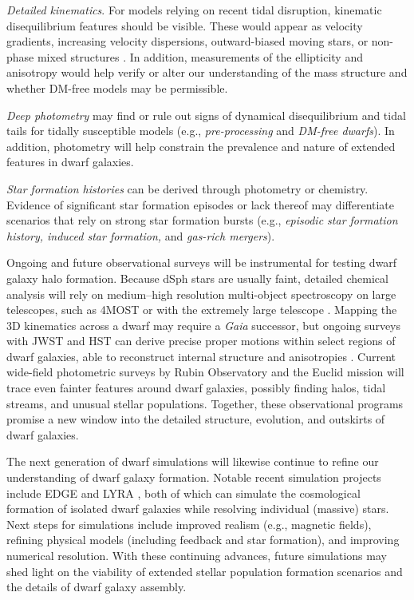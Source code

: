 \emph{Detailed kinematics}. For models relying on recent tidal
disruption, kinematic disequilibrium features should be visible. These
would appear as velocity gradients, increasing velocity dispersions,
outward-biased moving stars, or non-phase mixed structures
\citep[e.g,][]{kroupa1997, read+2006, sanchez-salcedo+hernandez2007}. In
addition, measurements of the ellipticity and anisotropy would help
verify or alter our understanding of the mass structure and whether
DM-free models may be permissible.

\emph{Deep photometry} may find or rule out signs of dynamical
disequilibrium and tidal tails for tidally susceptible models (e.g.,
\emph{pre-processing} and \emph{DM-free dwarfs}). In addition,
photometry will help constrain the prevalence and nature of extended
features in dwarf galaxies.

\emph{Star formation histories} can be derived through photometry or
chemistry. Evidence of significant star formation episodes or lack
thereof may differentiate scenarios that rely on strong star formation
bursts (e.g., \emph{episodic star formation history, induced star
formation,} and \emph{gas-rich mergers}).

Ongoing and future observational surveys will be instrumental for
testing dwarf galaxy halo formation. Because dSph stars are usually
faint, detailed chemical analysis will rely on medium--high resolution
multi-object spectroscopy on large telescopes, such as 4MOST
\citep{skuladottir+2023} or with the extremely large telescope
\citep{jagourel+2018}. Mapping the 3D kinematics across a dwarf may
require a \emph{Gaia} successor, but ongoing surveys with JWST and HST
can derive precise proper motions within select regions of dwarf
galaxies, able to reconstruct internal structure and anisotropies
\citep[e.g.,][]{vitral+2025}. Current wide-field photometric surveys by
Rubin Observatory \citep{ivezic+2019} and the Euclid mission
\citep{euclidcollaboration+2025} will trace even fainter features around
dwarf galaxies, possibly finding halos, tidal streams, and unusual
stellar populations. Together, these observational programs promise a
new window into the detailed structure, evolution, and outskirts of
dwarf galaxies.

The next generation of dwarf simulations will likewise continue to
refine our understanding of dwarf galaxy formation. Notable recent
simulation projects include EDGE \citep{agertz+2020} and LYRA
\citep{gutcke+2021}, both of which can simulate the cosmological
formation of isolated dwarf galaxies while resolving individual
(massive) stars. Next steps for simulations include improved realism
(e.g., magnetic fields), refining physical models (including feedback
and star formation), and improving numerical resolution. With these
continuing advances, future simulations may shed light on the viability
of extended stellar population formation scenarios and the details of
dwarf galaxy assembly.

